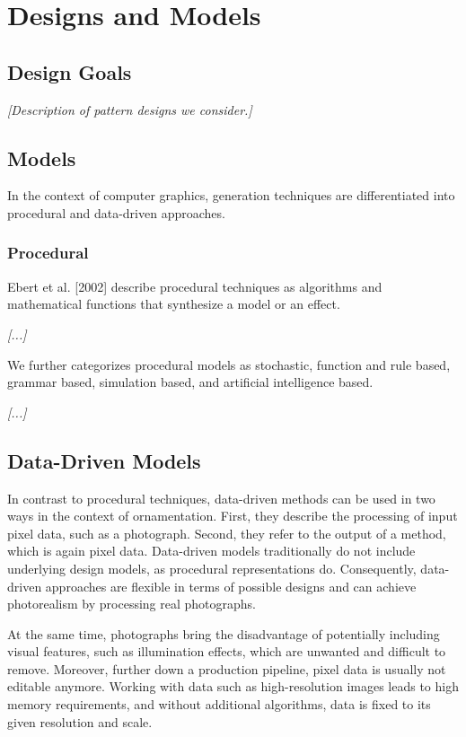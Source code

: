 
\section{Designs and Models}


\subsection{Design Goals}

\textit{[Description of pattern designs we consider.]}


\subsection{Models}

In the context of computer graphics, generation techniques are differentiated into procedural and data-driven approaches.

\subsubsection{Procedural}
Ebert et al. [2002] describe procedural techniques as algorithms and mathematical functions that synthesize a model or an effect.

\textit{[...]}

We further categorizes procedural models as stochastic, function and rule based, grammar based, simulation based, and artificial intelligence based. 

\textit{[...]}


\subsection[Data-Driven]{Data-Driven Models}
\label{subsec:design_models_datadriven}

In contrast to procedural techniques, data-driven methods can be used in two ways in the context of ornamentation. First, they describe the processing of input pixel data, such as a photograph. Second, they refer to the output of a method, which is again pixel data. Data-driven models traditionally do not include underlying design models, as procedural representations do. Consequently, data-driven approaches are flexible in terms of possible designs and can achieve photorealism by processing real photographs.

At the same time, photographs bring the disadvantage of potentially including visual features, such as illumination effects, which are unwanted and difficult to remove. Moreover, further down a production pipeline, pixel data is usually not editable anymore. Working with data such as high-resolution images leads to high memory requirements, and without additional algorithms, data is fixed to its given resolution and scale.

